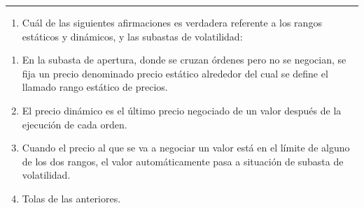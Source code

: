\documentclass[
  letterpaper,
  DIV=11,
  numbers=noendperiod]{scrreprt}
\providecommand{\tightlist}{%
  \setlength{\itemsep}{0pt}\setlength{\parskip}{0pt}}\usepackage{longtable,booktabs,array}
\begin{document}
\begin{center}\rule{0.5\linewidth}{0.5pt}\end{center}

\begin{enumerate}
\def\labelenumi{\arabic{enumi}.}
\setcounter{enumi}{16}
\tightlist
\item
  Cuál de las siguientes afirmaciones es verdadera referente a los
  rangos estáticos y dinámicos, y las subastas de volatilidad:
\end{enumerate}

\begin{enumerate}
\def\labelenumi{\alph{enumi})}
\item
  En la subasta de apertura, donde se cruzan órdenes pero no se
  negocian, se fija un precio denominado precio estático alrededor del
  cual se define el llamado rango estático de precios.
\item
  El precio dinámico es el último precio negociado de un valor después
  de la ejecución de cada orden.
\item
  Cuando el precio al que se va a negociar un valor está en el límite de
  alguno de los dos rangos, el valor automáticamente pasa a situación de
  subasta de volatilidad.
\item
  Tolas de las anteriores.
\end{enumerate}
\end{document}
